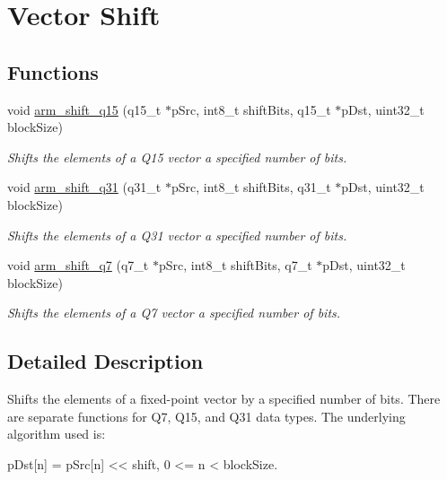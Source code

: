 \hypertarget{group__shift}{}\section{Vector Shift}
\label{group__shift}
\subsection*{Functions}
\begin{DoxyCompactItemize}
\item 
void \hyperlink{group__shift_gaa1757e53279780107acc92cf100adb61}{arm\+\_\+shift\+\_\+q15} (q15\+\_\+t $\ast$p\+Src, int8\+\_\+t shift\+Bits, q15\+\_\+t $\ast$p\+Dst, uint32\+\_\+t block\+Size)
\begin{DoxyCompactList}\small\item\em Shifts the elements of a Q15 vector a specified number of bits. \end{DoxyCompactList}\item 
void \hyperlink{group__shift_ga387dd8b7b87377378280978f16cdb13d}{arm\+\_\+shift\+\_\+q31} (q31\+\_\+t $\ast$p\+Src, int8\+\_\+t shift\+Bits, q31\+\_\+t $\ast$p\+Dst, uint32\+\_\+t block\+Size)
\begin{DoxyCompactList}\small\item\em Shifts the elements of a Q31 vector a specified number of bits. \end{DoxyCompactList}\item 
void \hyperlink{group__shift_ga47295d08a685f7de700a48dafb4db6fb}{arm\+\_\+shift\+\_\+q7} (q7\+\_\+t $\ast$p\+Src, int8\+\_\+t shift\+Bits, q7\+\_\+t $\ast$p\+Dst, uint32\+\_\+t block\+Size)
\begin{DoxyCompactList}\small\item\em Shifts the elements of a Q7 vector a specified number of bits. \end{DoxyCompactList}\end{DoxyCompactItemize}


\subsection{Detailed Description}
Shifts the elements of a fixed-\/point vector by a specified number of bits. There are separate functions for Q7, Q15, and Q31 data types. The underlying algorithm used is\+:


\begin{DoxyPre}
    pDst[n] = pSrc[n] << shift,   0 <= n < blockSize.
\end{DoxyPre}



